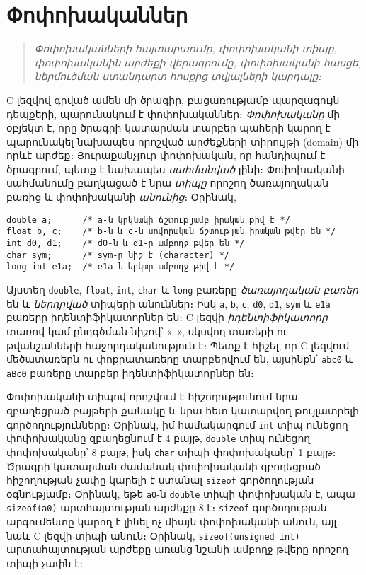 \chapter{Փոփոխականներ}

\begin{quote}
\emph{Փոփոխականների հայտարաումը, փոփոխականի տիպը, փոփոխականին արժեքի
վերագրումը, փոփոխականի հասցե, ներմուծման ստանդարտ հոսքից տվյալների
կարդալը։}
\end{quote}

C լեզվով գրված ամեն մի ծրագիր, բացառությամբ պարզագույն դեպքերի,
պարունակում է փոփոխականներ։ \emph{Փոփոխականը} մի օբյեկտ է, որը ծրագրի
կատարման տարբեր պահերի կարող է պարունակել նախապես որոշված արժեքների
տիրույթի (domain) մի որևէ արժեք։ Յուրաքանչյուր փոփոխական, որ հանդիպում է
ծրագրում, պետք է նախապես \emph{սահմանված} լինի։ Փոփոխականի սահմանումը
բաղկացած է նրա \emph{տիպը} որոշող ծառայողական բառից և փոփոխականի
\emph{անունից}։ Օրինակ,

\begin{verbatim}
double a;      /* a-ն կրկնակի ճշտությամբ իրական թիվ է */
float b, c;    /* b-ն և c-ն սովորական ճշտության իրական թվեր են */
int d0, d1;    /* d0-ն և d1-ը ամբողջ թվեր են */
char sym;      /* sym-ը նիշ է (character) */
long int e1a;  /* e1a-ն երկար ամբողջ թիվ է */
\end{verbatim}

Այստեղ \texttt{double}, \texttt{float}, \texttt{int}, \texttt{char} և
\texttt{long} բառերը \emph{ծառայողական բառեր} են և \emph{ներդրված}
տիպերի անուններ։ Իսկ \texttt{a}, \texttt{b}, \texttt{c}, \texttt{d0},
\texttt{d1}, \texttt{sym} և \texttt{e1a} բառերը իդենտիֆիկատորներ են։ C
լեզվի \emph{իդենտիֆիկատորը} տառով կամ ընդգծման նիշով՝ «\texttt{\_}»,
սկսվող տառերի ու թվանշանների հաջորդականություն է։ Պետք է հիշել, որ C
լեզվում մեծատառերն ու փոքրատառերը տարբերվում են, այսինքն՝ \texttt{abc0}
և \texttt{aBc0} բառերը տարբեր իդենտիֆիկատորներ են։

Փոփոխականի տիպով որոշվում է հիշողությունում նրա զբաղեցրած բայթերի քանակը
և նրա հետ կատարվող թույլատրելի գործողությունները։ Օրինակ, իմ համակարգում
\texttt{int} տիպ ունեցող փոփոխականը զբաղեցնում է 4 բայթ, \texttt{double}
տիպ ունեցող փոփոխականը՝ 8 բայթ, իսկ \texttt{char} տիպի փոփոխականը՝ 1
բայթ։ Ծրագրի կատարման ժամանակ փոփոխականի զբողեցրած հիշողության չափը
կարելի է ստանալ \texttt{sizeof} գործողության օգնությամբ։ Օրինակ, եթե
\texttt{a0}-ն \texttt{double} տիպի փոփոխական է, ապա \texttt{sizeof(a0)}
արտհայտության արժեքը 8 է։ \texttt{sizeof} գործողության արգումենտը կարող
է լինել ոչ միայն փոփոխականի անուն, այլ նաև C լեզվի տիպի անուն։ Օրինակ,
\texttt{sizeof(unsigned\ int)} արտահայտության արժեքը առանց նշանի ամբողջ
թվերը որոշող տիպի չափն է։

